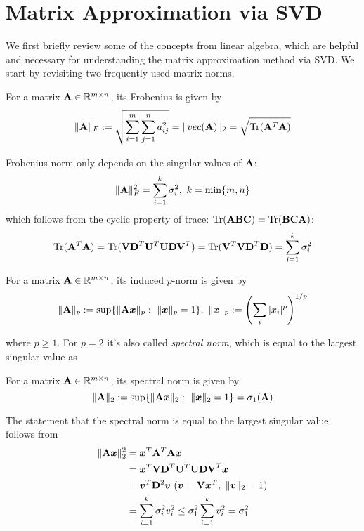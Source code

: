 \documentclass[../main.tex]{subfiles}
\begin{document}
\section{Matrix Approximation via SVD}
We first briefly review some of the concepts from linear algebra, which are helpful and necessary for understanding the matrix approximation method via SVD. We start by revisiting two frequently used matrix norms.
\begin{definition} For a matrix ${\bf A}\in \mathbb{R}^{m \times n}$, its Frobenius is given by
	\begin{equation*}
	\|{\bf A}\|_F :=\sqrt{\sum_{i=1}^{m}\sum_{j=1}^{n}a_{ij}^2}=\|vec({\bf A})\|_2=\sqrt{{\rm Tr}({\bf A}^T{\bf A})}
	\end{equation*}
\end{definition}
Frobenius norm only depends on the singular values of ${\bf A}$:
\begin{equation*}
\|{\bf A}\|_F^2 = \sum_{i=1}^{k}\sigma_i^2,\ k=\min\{m,n\}
\end{equation*}
which follows from the cyclic property of trace: ${\rm Tr}({\bf ABC})={\rm Tr}({\bf BCA})$:
\begin{equation*}
{\rm Tr}({\bf A}^T{\bf A}) = {\rm Tr}({\bf VD}^T{\bf U}^T{\bf UDV}^T)={\rm Tr}({\bf V}^T{\bf VD}^T{\bf D}) = \sum_{i=1}^{k}\sigma_i^2
\end{equation*}
\begin{definition} 
	For a matrix ${\bf A}\in \mathbb{R}^{m \times n}$, its induced $p$-norm is given by
	\begin{equation*}
	\|{\bf A}\|_p :=\sup\{\|{\bf A}\bm{x}\|_p:\ \|\bm{x}\|_p=1\},\ \|\bm{x}\|_p:=\left(\sum_{i}|x_i|^p\right)^{1/p}
	\end{equation*}
\end{definition}
where $p \geq 1$. For $p=2$ it's also called \emph{spectral norm}, which is equal to the largest singular value as
\begin{definition}
	For a matrix ${\bf A}\in \mathbb{R}^{m \times n}$, its spectral norm is given by
	\begin{equation*}
	\|{\bf A}\|_2 :=\sup\{\|{\bf A}\bm{x}\|_2:\ \|\bm{x}\|_2=1\}=\sigma_1({\bf A})
	\end{equation*}
\end{definition}
The statement that the spectral norm is equal to the largest singular value follows from
\begin{align*}
\|{\bf A}\bm{x}\|_2^2 
&= \bm{x}^T{\bf A}^T{\bf A}\bm{x}\\
&=  \bm{x}^T{\bf VD}^T{\bf U}^T{\bf UDV}^T\bm{x}\\
&= \bm{v}^T{\bf D}^2\bm{v}\ (\bm{v} = {\bf V}\bm{x}^T,\ \|\bm{v}\|_2=1)\\
&= \sum_{i=1}^{k} \sigma_i^2v_i^2\leq \sigma_1^2\sum_{i=1}^{k}v_i^2 = \sigma_1^2
\end{align*}
\end{document}

